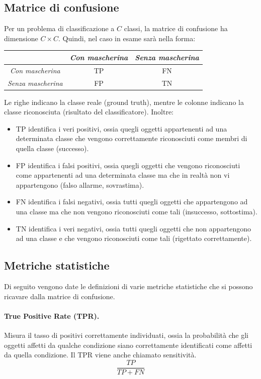 \documentclass[12pt]{article}
\begin{document}
\subsection{Matrice di confusione}
Per un problema di classificazione a $C$ classi, la matrice di confusione ha dimensione $C \times C$. Quindi, nel caso in esame sarà nella forma:
\begin{center}
\begin{tabular}{ccc}
    \toprule
    & \textit{Con mascherina} & \textit{Senza mascherina} \\
    
    \midrule
    \textit{Con mascherina} & TP & FN \\
    
    \midrule
    \textit{Senza mascherina} & FP & TN \\

    \bottomrule
\end{tabular}
\end{center}
Le righe indicano la classe reale (ground truth), mentre le colonne indicano la classe riconosciuta (risultato del classificatore). Inoltre:
\begin{itemize}
    \item TP identifica i veri positivi, ossia quegli oggetti appartenenti ad una determinata classe che vengono correttamente riconosciuti come membri di quella classe (successo).
    \item FP identifica i falsi positivi, ossia quegli oggetti che vengono riconosciuti come appartenenti ad una determinata classe ma che in realtà non vi appartengono (falso allarme, sovrastima).
    \item FN identifica i falsi negativi, ossia tutti quegli oggetti che appartengono ad una classe ma che non vengono riconosciuti come tali (insuccesso, sottostima).
    \item TN identifica i veri negativi, ossia tutti quegli oggetti che non appartengono ad una classe e che vengono riconosciuti come tali (rigettato correttamente).
\end{itemize}

\subsection{Metriche statistiche}
\label{acc}
Di seguito vengono date le definizioni di varie metriche statistiche che si possono ricavare dalla matrice di confusione.
\paragraph{True Positive Rate (TPR).} Misura il tasso di positivi correttamente individuati, ossia la probabilità che gli oggetti affetti da qualche condizione siano correttamente identificati come affetti da quella condizione. Il TPR viene anche chiamato sensitività.
\[ \frac{TP}{TP+FN} \]
\end{document}
